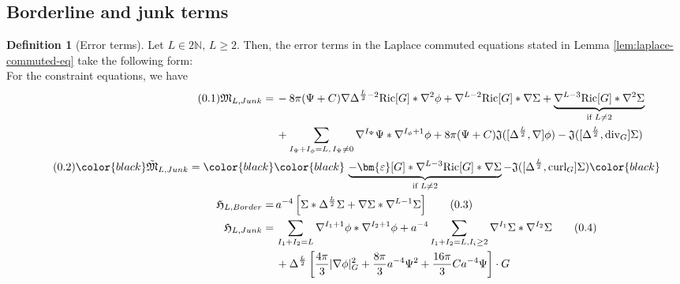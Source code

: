 \documentclass[11pt,leqno,textwidth=10cm]{amsart}
\numberwithin{equation}{section}
\theoremstyle{definition}
\newtheorem{definition}{Definition}[section]
\theoremstyle{plain}
\newcommand{\1}{\mathbbm{1}}
\newcommand{\N}{\mathbb{N}}
\newcommand{\Ric}{\text{\normalfont{Ric}}}
\renewcommand{\epsilon}{\varepsilon}
\newcommand{\Lap}{\Delta}
\renewcommand{\div}{\text{\normalfont{div}}}
\newcommand{\curl}{\text{\normalfont{curl}}}
\newcommand{\numberthis}{\addtocounter{equation}{1}\tag{\theequation}}
\renewcommand{\theequation}{\arabic{section}.\arabic{equation}}
\newcommand{\epsilonLC}{\bm{\epsilon}}
\newcommand{\change}[1]{\color{black}#1\color{black}}
\begin{document}
\subsection{Borderline and junk terms}\label{subsec:error-terms}

\begin{definition}[Error terms]\label{def:error-terms} Let $L\in2\N,\,L\geq 2$. Then, the error terms in the Laplace commuted equations stated in Lemma \ref{lem:laplace-commuted-eq} take the following form:\\

\noindent For the constraint equations, we have
{\scriptsize \begin{subequations}
\begin{align*}
\numberthis\label{eq:comeq-mom-div-junk}\mathfrak{M}_{L,Junk}=&\,-8\pi(\Psi+C)\nabla\Lap^{\frac{L}2-2}\Ric[G]\ast\nabla^2\phi+\nabla^{L-2}\Ric[G]\ast\nabla\Sigma+\underbrace{\nabla^{L-3}\Ric[G]\ast\nabla^2\Sigma}_{\text{if }L\neq 2}\\
&\,+\sum_{I_\Psi+I_\phi=L,\,I_\Psi\neq 0}\nabla^{I_\Psi}\Psi\ast\nabla^{I_\phi+1}\phi+8\pi(\Psi+C)\mathfrak{J}([\Lap^{\frac{L}2},\nabla]\phi)-\mathfrak{J}([\Lap^{\frac{L}2},\div_G]\Sigma)\\
\numberthis\label{eq:comeq-mom-curl-junk}\change{\tilde{\mathfrak{M}}_{L,Junk}=}&\change{\,\underbrace{-\epsilonLC[G]\ast\nabla^{L-3}\Ric[G]\ast\nabla\Sigma}_{\text{if }L\neq 2}-\mathfrak{J}([\Lap^\frac{L}2,\curl_G]\Sigma)}\\
\mathfrak{H}_{L,Border}=&\,a^{-4}\left[\Sigma\ast\Lap^{\frac{L}2}\Sigma+\nabla\Sigma\ast\nabla^{L-1}\Sigma\right] \numberthis\label{eq:comeq-Ham-border}\\
\mathfrak{H}_{L,Junk}=&\,\sum_{I_1+I_2=L}\nabla^{I_1+1}\phi\ast\nabla^{I_2+1}\phi+a^{-4}\sum_{I_1+I_2=L,I_i\geq2}\nabla^{I_1}\Sigma\ast\nabla^{I_2}\Sigma \numberthis\label{eq:comeq-Ham-junk}\\
&\,+\Lap^\frac{L}2\left[\frac{4\pi}3\lvert\nabla\phi\rvert_G^2+\frac{8\pi}3a^{-4}\Psi^2+\frac{16\pi}3Ca^{-4}\Psi\right]\cdot G
\end{align*}

\end{subequations}}
\end{definition}
\end{document}
